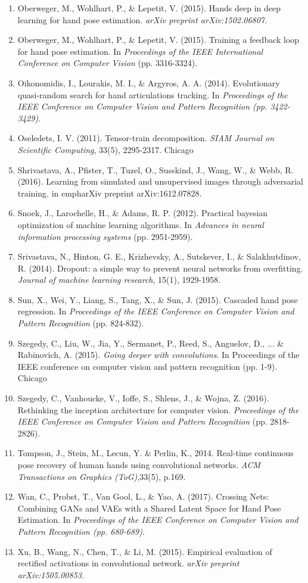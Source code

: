 \documentclass{article}
\begin{document}
{\begin{enumerate}
\item Oberweger, M., Wohlhart, P., \& Lepetit, V. (2015). Hands deep in deep learning for hand pose estimation. \emph{arXiv preprint arXiv:1502.06807}.
\item Oberweger, M., Wohlhart, P., \& Lepetit, V. (2015). Training a feedback loop for hand pose estimation. In \emph{Proceedings of the IEEE International Conference on Computer Vision} (pp. 3316-3324).
\item Oikonomidis, I., Lourakis, M. I., \& Argyros, A. A. (2014). Evolutionary quasi-random search for hand articulations tracking. In \emph{Proceedings of the IEEE Conference on Computer Vision and Pattern Recognition (pp. 3422-3429)}.
\item Oseledets, I. V. (2011). Tensor-train decomposition. \emph{SIAM Journal on Scientific Computing}, 33(5), 2295-2317.
Chicago	
\item Shrivastava, A., Pfister, T., Tuzel, O., Susskind, J., Wang, W., \& Webb, R. (2016). Learning from simulated and unsupervised images through adversarial training. in emph{arXiv preprint arXiv:1612.07828}.
\item Snoek, J., Larochelle, H., \& Adams, R. P. (2012). Practical bayesian optimization of machine learning algorithms. In \emph{Advances in neural information processing systems} (pp. 2951-2959).
\item Srivastava, N., Hinton, G. E., Krizhevsky, A., Sutskever, I., \& Salakhutdinov, R. (2014). Dropout: a simple way to prevent neural networks from overfitting. \emph{Journal of machine learning research}, 15(1), 1929-1958.
\item Sun, X., Wei, Y., Liang, S., Tang, X., \& Sun, J. (2015). Cascaded hand pose regression. In \emph{Proceedings of the IEEE Conference on Computer Vision and Pattern Recognition} (pp. 824-832).
\item Szegedy, C., Liu, W., Jia, Y., Sermanet, P., Reed, S., Anguelov, D., ... \& Rabinovich, A. (2015). \emph{Going deeper with convolutions}. In Proceedings of the IEEE conference on computer vision and pattern recognition (pp. 1-9).
Chicago
\item Szegedy, C., Vanhoucke, V., Ioffe, S., Shlens, J., \& Wojna, Z. (2016). Rethinking the inception architecture for computer vision. \emph{Proceedings of the IEEE Conference on Computer Vision and Pattern Recognition} (pp. 2818-2826).
\item Tompson, J., Stein, M., Lecun, Y. \& Perlin, K., 2014. Real-time continuous pose recovery of human hands using convolutional networks. \emph{ACM Transactions on Graphics (ToG)},33(5), p.169.
\item Wan, C., Probst, T., Van Gool, L., \& Yao, A. (2017). Crossing Nets: Combining GANs and VAEs with a Shared Latent Space for Hand Pose Estimation. In \emph{Proceedings of the IEEE Conference on Computer Vision and Pattern Recognition (pp. 680-689)}.
\item Xu, B., Wang, N., Chen, T., \& Li, M. (2015). Empirical evaluation of rectified activations in convolutional network. \emph{arXiv preprint arXiv:1505.00853}.



\end{enumerate}}
\end{document}
